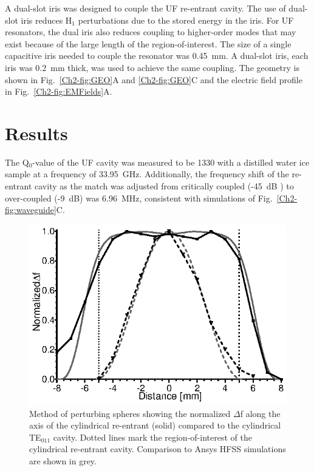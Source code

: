 A dual-slot iris was designed to couple the UF re-entrant \cylTE{} cavity. The use of dual-slot iris reduces H$_1$ perturbations due to the stored energy in the iris. For UF resonators, the dual iris also reduces coupling to higher-order modes that may exist because of the large length of the region-of-interest. \cite{UFLGR2017} The size of a single capacitive iris needed to couple the resonator was 0.45~mm. A dual-slot iris, each iris was 0.2~mm thick, was used to achieve the same coupling. The geometry is shown in Fig.~\ref{Ch2-fig:GEO}A and \ref{Ch2-fig:GEO}C and the electric field profile in Fig.~\ref{Ch2-fig:EMFields}A.

\section{Results}
The Q$_0$-value of the UF cavity was measured to be 1330 with a distilled water ice sample at a frequency of 33.95~GHz. Additionally, the frequency shift of the re-entrant \cylTE{} cavity as the match was adjusted from critically coupled (-45~dB ) to over-coupled (-9~dB) was 6.96~MHz, consistent with simulations of Fig.~\ref{Ch2-fig:waveguide}C. 

\begin{figure}[htb]\centering
 \includegraphics{Kapitel/Ch2-Images/05-TE01Uperturb.eps}
 \caption[Measured magnetic field using perturbing spheres.]{Method of perturbing spheres showing the normalized $\Delta$f along the axis of the cylindrical re-entrant \cylTE{} (solid) compared to the cylindrical TE$_{\text{011}}$ cavity. Dotted lines mark the region-of-interest of the cylindrical re-entrant \cylTE{} cavity.  Comparison to Ansys HFSS simulations are shown in grey.}
 \label{Ch2-fig:perturb}
\end{figure}

